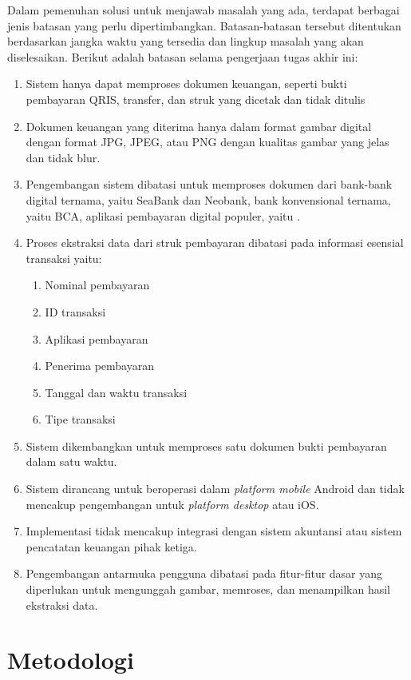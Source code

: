 Dalam pemenuhan solusi untuk menjawab masalah yang ada, terdapat berbagai jenis batasan yang perlu dipertimbangkan. Batasan-batasan tersebut ditentukan berdasarkan jangka waktu yang tersedia dan lingkup masalah yang akan diselesaikan. Berikut adalah batasan selama pengerjaan tugas akhir ini:
\begin{enumerate}
	\item Sistem hanya dapat memproses dokumen keuangan, seperti bukti pembayaran QRIS, transfer, dan struk yang dicetak dan tidak ditulis
	\item Dokumen keuangan yang diterima hanya dalam format gambar digital dengan format JPG, JPEG, atau PNG dengan kualitas gambar yang jelas dan tidak blur.
	\item  Pengembangan sistem dibatasi untuk memproses dokumen dari bank-bank digital ternama, yaitu SeaBank dan Neobank, bank konvensional ternama, yaitu BCA, aplikasi pembayaran digital populer, yaitu \gopay{}.
	\item  Proses ekstraksi data dari struk pembayaran dibatasi pada informasi esensial transaksi yaitu:
	      \begin{enumerate}
		      \item Nominal pembayaran
		      \item ID transaksi
		      \item Aplikasi pembayaran
		      \item Penerima pembayaran
		      \item Tanggal dan waktu transaksi
		      \item Tipe transaksi
	      \end{enumerate}
	\item Sistem dikembangkan untuk memproses satu dokumen bukti pembayaran dalam satu waktu.
	\item Sistem dirancang untuk beroperasi dalam \emph{platform mobile} Android dan tidak mencakup pengembangan untuk \emph{platform desktop} atau iOS.
	\item Implementasi tidak mencakup integrasi dengan sistem akuntansi atau sistem pencatatan keuangan pihak ketiga.
	\item Pengembangan antarmuka pengguna dibatasi pada fitur-fitur dasar yang diperlukan untuk mengunggah gambar, memroses, dan menampilkan hasil ekstraksi data.
\end{enumerate}

\section{Metodologi}
\label{sec:metodologi}

